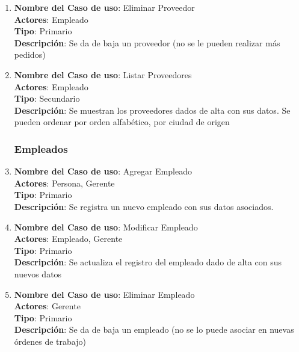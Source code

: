 \documentclass[12pt]{extarticle}
\begin{document}
\begin{spacing}{1.2}
\begin{enumerate}
            \item 	\textbf{Nombre del Caso de uso}: Eliminar Proveedor\\
                    \textbf{Actores}: Empleado\\
                    \textbf{Tipo}: Primario\\
                    \textbf{Descripción}: Se da de baja un proveedor (no se le pueden realizar más pedidos)
            
            \item 	\textbf{Nombre del Caso de uso}: Listar Proveedores\\
                    \textbf{Actores}: Empleado\\
                    \textbf{Tipo}: Secundario\\
                    \textbf{Descripción}: Se muestran los proveedores dados de alta con sus datos. Se pueden ordenar por orden alfabético, por ciudad de origen



            \subsubsection{Empleados}



            \item 	\textbf{Nombre del Caso de uso}: Agregar Empleado\\
                    \textbf{Actores}: Persona, Gerente\\
                    \textbf{Tipo}: Primario\\
                    \textbf{Descripción}: Se registra un nuevo empleado con sus datos asociados.
            
            \item 	\textbf{Nombre del Caso de uso}: Modificar Empleado\\
                    \textbf{Actores}: Empleado, Gerente\\
                    \textbf{Tipo}: Primario\\
                    \textbf{Descripción}: Se actualiza el registro del empleado dado de alta con sus nuevos datos
            
            \item 	\textbf{Nombre del Caso de uso}: Eliminar Empleado\\
                    \textbf{Actores}: Gerente\\
                    \textbf{Tipo}: Primario\\
                    \textbf{Descripción}: Se da de baja un empleado (no se lo puede asociar en nuevas órdenes de trabajo)
            

\end{enumerate}
\end{spacing}
\end{document}
